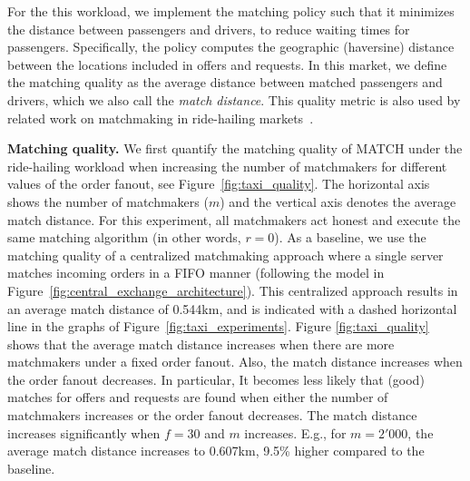For the this workload, we implement the matching policy such that it minimizes the distance between passengers and drivers, to reduce waiting times for passengers.
Specifically, the policy computes the geographic (haversine) distance between the locations included in offers and requests.
In this market, we define the matching quality as the average distance between matched passengers and drivers, which we also call the \emph{match distance}.
This quality metric is also used by related work on matchmaking in ride-hailing markets~\cite{pham2017oride}.

\textbf{Matching quality.}
We first quantify the matching quality of MATCH under the ride-hailing workload when increasing the number of matchmakers for different values of the order fanout, see Figure~\ref{fig:taxi_quality}.
The horizontal axis shows the number of matchmakers ($ m $) and the vertical axis denotes the average match distance.
For this experiment, all matchmakers act honest and execute the same matching algorithm (in other words, $ r = 0 $).
As a baseline, we use the matching quality of a centralized matchmaking approach where a single server matches incoming orders in a FIFO manner (following the model in Figure~\ref{fig:central_exchange_architecture}).
This centralized approach results in an average match distance of 0.544km, and is indicated with a dashed horizontal line in the graphs of Figure~\ref{fig:taxi_experiments}.
Figure \ref{fig:taxi_quality} shows that the average match distance increases when there are more matchmakers under a fixed order fanout.
Also, the match distance increases when the order fanout decreases.
In particular, It becomes less likely that (good) matches for offers and requests are found when either the number of matchmakers increases or the order fanout decreases.
The match distance increases significantly when $ f = 30 $ and $ m $ increases. E.g., for $ m = 2'000 $, the average match distance increases to 0.607km, 9.5\% higher compared to the baseline.

